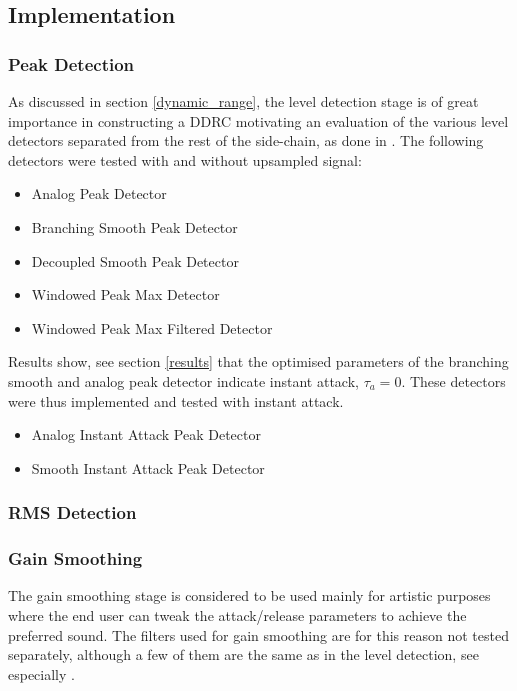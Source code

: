 \documentclass[../main2.tex]{subfiles}
\begin{document}
\subsection{Implementation} \label{method_implementation}
\subsubsection{Peak Detection}
As discussed in section \ref{dynamic_range}, the level detection stage is of great importance in constructing a DDRC motivating an evaluation of the various level detectors separated from the rest of the side-chain, as done in \cite{reiss2012tutorial}. The following detectors were tested with and without upsampled signal:
\begin{itemize}
\item{Analog Peak Detector} 
\item{Branching Smooth Peak Detector}
\item{Decoupled Smooth Peak Detector}
\item{Windowed Peak Max Detector}
\item{Windowed Peak Max Filtered Detector}
\end{itemize}
Results show, see section \ref{results} that the optimised parameters of the branching smooth and analog peak detector indicate instant attack, $\tau_a = 0$. These detectors were thus implemented and tested with instant attack.

\begin{itemize}
\item{Analog Instant Attack Peak Detector}
\item{Smooth Instant Attack Peak Detector}
\end{itemize}

\subsubsection{RMS Detection}

\subsubsection{Gain Smoothing}
The gain smoothing stage is considered to be used mainly for artistic purposes where the end user can tweak the attack/release parameters to achieve the preferred sound. The filters used for gain smoothing are for this reason not tested separately, although a few of them are the same as in the level detection, see especially \cite{reiss2012tutorial}.
\end{document}
